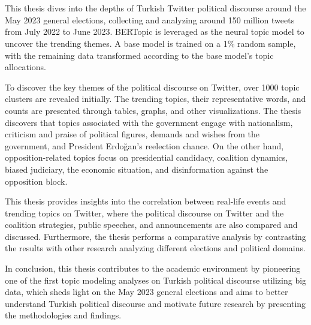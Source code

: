 \chapter{\abstractname}

This thesis dives into the depths of Turkish Twitter political discourse around the May 2023 
general elections, collecting and analyzing around 150 million tweets from July 2022 to June 2023. 
BERTopic is leveraged as the neural topic model to uncover the trending themes. A base model is 
trained on a 1\% random sample, with the remaining data transformed according to the base model's 
topic allocations.

To discover the key themes of the political discourse on Twitter, over 1000 topic clusters are 
revealed initially. The trending topics, their representative words, and counts are presented 
through tables, graphs, and other visualizations. The thesis discovers that topics associated with 
the government engage with nationalism, criticism and praise of political figures, demands and 
wishes from the government, and President Erdoğan's reelection chance. On the other hand, 
opposition-related topics focus on presidential candidacy, coalition dynamics, biased judiciary, 
the economic situation, and disinformation against the opposition block.

This thesis provides insights into the correlation between real-life events and trending topics on 
Twitter, where the political discourse on Twitter and the coalition strategies, public speeches, 
and announcements are also compared and discussed. Furthermore, the thesis performs a comparative 
analysis by contrasting the results with other research analyzing different elections and political 
domains.

In conclusion, this thesis contributes to the academic environment by pioneering one of the 
first topic modeling analyses on Turkish political discourse utilizing big data, which sheds 
light on the May 2023 general elections and aims to better understand Turkish political discourse 
and motivate future research by presenting the methodologies and findings.